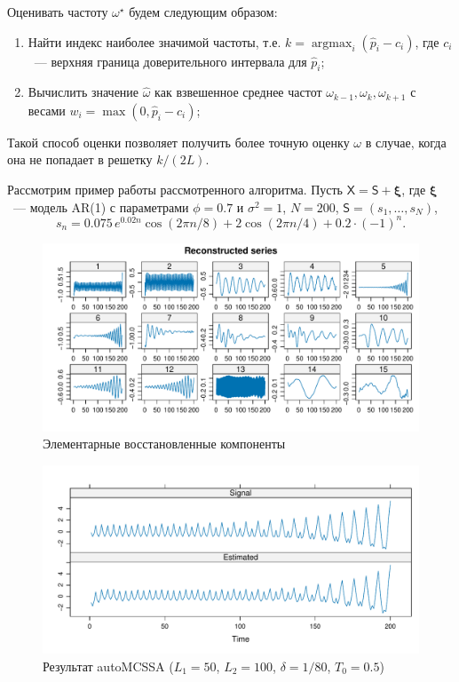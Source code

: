 \documentclass[12pt]{article}
\begin{document}
Оценивать частоту $\omega^\star$ будем следующим образом:
\begin{enumerate}
    \item Найти индекс наиболее значимой частоты, т.е. $k=\operatorname{argmax}_i(\widehat{p}_i-c_i)$, где $c_i$~--- верхняя граница доверительного интервала для $\widehat{p}_i$;
    \item Вычислить значение $\hat\omega$ как взвешенное среднее частот $\omega_{k-1}, \omega_k,\omega_{k+1}$ с весами $w_i=\max(0, \widehat{p}_i-c_i)$;
\end{enumerate}
Такой способ оценки позволяет получить более точную оценку $\omega$ в случае, когда она не попадает в решетку $k/(2L)$.

Рассмотрим пример работы рассмотренного алгоритма. Пусть $\mathsf{X}=\mathsf{S}+\bm{\xi}$, где $\bm\xi$~--- модель AR(1) с параметрами $\phi=0.7$ и $\sigma^2=1$, $N=200$, $\mathsf{S}=(s_1,\ldots, s_N)$,
\[
s_n=0.075\, e^{0.02n}\cos(2\pi n/8) + 2\cos(2\pi n / 4) + 0.2\cdot(-1)^n.
\]
\begin{figure}[htbp]
    \centering
    \includegraphics[width=\textwidth]{img/reconstructed_ts.pdf}
    \caption{Элементарные восстановленные компоненты}
    \label{fig:reconstructed_ts}
\end{figure}
\begin{figure}[htbp]
    \centering
    \includegraphics[width=\textwidth]{img/auto_mcssa_result.pdf}
    \caption{Результат autoMCSSA ($L_1=50$, $L_2=100$, $\delta=1/80$, $T_0=0.5$)}
    \label{fig:autoMCSSA_res}
\end{figure}
\end{document}
